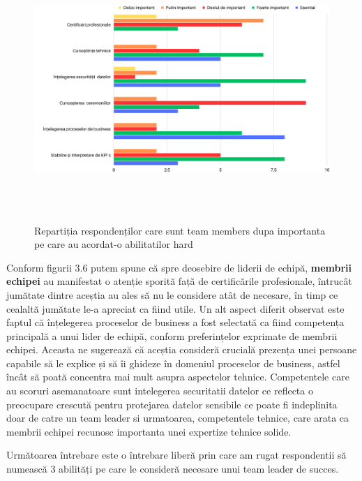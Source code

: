 \documentclass[a4paper, 12pt]{article}
\begin{document}
\begin{enumerate}[A)]
		\begin{figure}[!htb]
			\centering
			\includegraphics[width=15cm, height=10cm]{"figures/team members (1).png"}
			\caption {Repartiția respondenților care sunt team members dupa importanta pe care au acordat-o abilitatilor hard}\label{fig:four}
			
		\end{figure}

		\quad Conform figurii 3.6 putem spune că spre deosebire de liderii de echipă, \textbf{membrii echipei} au manifestat o atenție sporită față de certificările profesionale, întrucât jumătate dintre aceștia au ales să nu le considere atât de necesare, în timp ce cealaltă jumătate le-a apreciat ca fiind utile. Un alt aspect diferit observat este faptul că înțelegerea proceselor de business a fost selectată ca fiind competența principală a unui lider de echipă, conform preferințelor exprimate de membrii echipei. Aceasta ne sugerează că aceștia consideră crucială prezența unei persoane capabile să le explice și să îi ghideze în domeniul proceselor de business, astfel încât să poată concentra mai mult asupra aspectelor tehnice. Competentele  care au scoruri asemanatoare sunt intelegerea securitatii datelor ce reflecta o preocupare crescută pentru protejarea datelor sensibile ce poate fi indeplinita doar de catre un team leader si urmatoarea, competentele tehnice, care arata ca membrii echipei recunosc importanta unei expertize tehnice solide.


	\quad Următoarea întrebare este o întrebare liberă prin care am rugat respondentii să numească 3 abilități pe care le consideră necesare unui team leader de succes. 


\end{enumerate}
\end{document}
